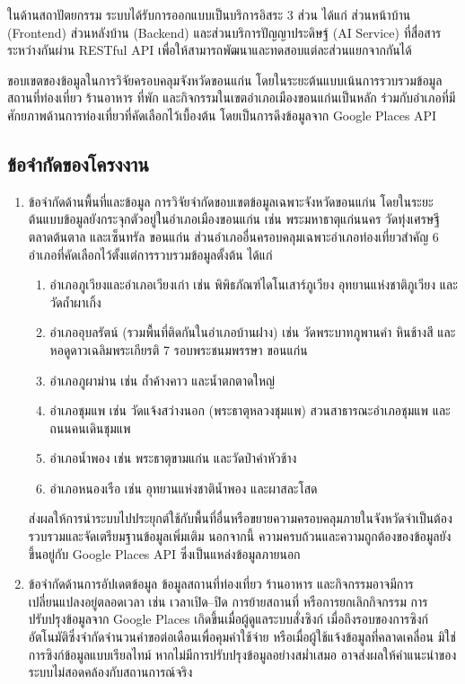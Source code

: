ในด้านสถาปัตยกรรม ระบบได้รับการออกแบบเป็นบริการอิสระ 3 ส่วน ได้แก่ ส่วนหน้าบ้าน (Frontend) ส่วนหลังบ้าน (Backend) และส่วนบริการปัญญาประดิษฐ์ (AI Service) ที่สื่อสารระหว่างกันผ่าน RESTful API เพื่อให้สามารถพัฒนาและทดสอบแต่ละส่วนแยกจากกันได้

ขอบเขตของข้อมูลในการวิจัยครอบคลุมจังหวัดขอนแก่น โดยในระยะต้นแบบเน้นการรวบรวมข้อมูลสถานที่ท่องเที่ยว ร้านอาหาร ที่พัก และกิจกรรมในเขตอำเภอเมืองขอนแก่นเป็นหลัก ร่วมกับอำเภอที่มีศักยภาพด้านการท่องเที่ยวที่คัดเลือกไว้เบื้องต้น โดยเป็นการดึงข้อมูลจาก Google Places API


\subsection{ข้อจำกัดของโครงงาน}

\begin{enumerate}
\item ข้อจำกัดด้านพื้นที่และข้อมูล การวิจัยจำกัดขอบเขตข้อมูลเฉพาะจังหวัดขอนแก่น โดยในระยะต้นแบบข้อมูลยังกระจุกตัวอยู่ในอำเภอเมืองขอนแก่น เช่น พระมหาธาตุแก่นนคร วัดทุ่งเศรษฐี ตลาดต้นตาล และเซ็นทรัล ขอนแก่น ส่วนอำเภออื่นครอบคลุมเฉพาะอำเภอท่องเที่ยวสำคัญ 6 อำเภอที่คัดเลือกไว้ตั้งแต่การรวบรวมข้อมูลตั้งต้น ได้แก่
\begin{enumerate}
\item อำเภอภูเวียงและอำเภอเวียงเก่า เช่น พิพิธภัณฑ์ไดโนเสาร์ภูเวียง อุทยานแห่งชาติภูเวียง และวัดถ้ำผาเกิ้ง
\item อำเภออุบลรัตน์ (รวมพื้นที่ติดกันในอำเภอบ้านฝาง) เช่น วัดพระบาทภูพานคำ หินช้างสี และหอดูดาวเฉลิมพระเกียรติ 7 รอบพระชนมพรรษา ขอนแก่น
\item อำเภอภูผาม่าน เช่น ถ้ำค้างคาว และน้ำตกตาดใหญ่
\item อำเภอชุมแพ เช่น วัดแจ้งสว่างนอก (พระธาตุหลวงชุมแพ) สวนสาธารณะอำเภอชุมแพ และถนนคนเดินชุมแพ
\item อำเภอน้ำพอง เช่น พระธาตุขามแก่น และวัดป่าคำหัวช้าง
\item อำเภอหนองเรือ เช่น อุทยานแห่งชาติน้ำพอง และผาสละโสด
\end{enumerate}
ส่งผลให้การนำระบบไปประยุกต์ใช้กับพื้นที่อื่นหรือขยายความครอบคลุมภายในจังหวัดจำเป็นต้องรวบรวมและจัดเตรียมฐานข้อมูลเพิ่มเติม นอกจากนี้ ความครบถ้วนและความถูกต้องของข้อมูลยังขึ้นอยู่กับ Google Places API ซึ่งเป็นแหล่งข้อมูลภายนอก
\item ข้อจำกัดด้านการอัปเดตข้อมูล ข้อมูลสถานที่ท่องเที่ยว ร้านอาหาร และกิจกรรมอาจมีการเปลี่ยนแปลงอยู่ตลอดเวลา เช่น เวลาเปิด--ปิด การย้ายสถานที่ หรือการยกเลิกกิจกรรม การปรับปรุงข้อมูลจาก Google Places เกิดขึ้นเมื่อผู้ดูแลระบบสั่งซิงก์ เมื่อถึงรอบของการซิงก์อัตโนมัติซึ่งจำกัดจำนวนคำขอต่อเดือนเพื่อคุมค่าใช้จ่าย หรือเมื่อผู้ใช้แจ้งข้อมูลที่คลาดเคลื่อน มิใช่การซิงก์ข้อมูลแบบเรียลไทม์ หากไม่มีการปรับปรุงข้อมูลอย่างสม่ำเสมอ อาจส่งผลให้คำแนะนำของระบบไม่สอดคล้องกับสถานการณ์จริง

\end{enumerate}
